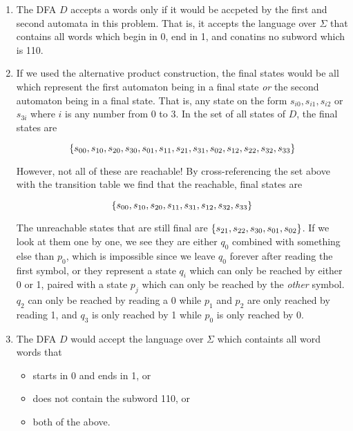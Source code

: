 \documentclass{article}
\begin{document}
\begin{enumerate}
    \item
        The DFA $D$ accepts a words only if it would be accpeted by the first and second automata in this problem. That is, it accepts the language over $\Sigma$ that contains all words which begin in 0, end in 1, and conatins no subword which is 110.
    \item
        If we used the alternative product construction, the final states would be all which represent the first automaton being in a final state \textit{or} the second automaton being in a final state. That is, any state on the form $s_{i0}, s_{i1}, s_{i2}$ or $s_{3i}$ where $i$ is any number from 0 to 3. In the set of all states of $D$, the final states are

        $$\set{s_{00},s_{10},s_{20}, s_{30}, s_{01},s_{11},s_{21},s_{31}, s_{02},s_{12},s_{22},s_{32},s_{33}}$$
 
        However, not all of these are reachable! By cross-referencing the set above with the transition table we find that the reachable, final states are

        $$\set{s_{00},s_{10},s_{20}, s_{11}, s_{31}, s_{12},s_{32},s_{33}}$$

        The unreachable states that are still final are $\set{s_{21},s_{22}, s_{30}, s_{01}, s_{02}}$. If we look at them one by one, we see they are either $q_0$ combined with something else than $p_0$, which is impossible since we leave $q_0$ forever after reading the first symbol, or they represent a state $q_i$ which can only be reached by either 0 or 1, paired with a state $p_j$ which can only be reached by the \textit{other} symbol. $q_2$ can only be reached by reading a 0 while $p_1$ and $p_2$ are only reached by reading 1, and $q_3$ is only reached by 1 while $p_0$ is only reached by 0.

    \item
        The DFA $D$ would accept the language over $\Sigma$ which containts all word words that

        \begin{itemize}
            \item starts in 0 and ends in 1, or
            \item does not contain the subword 110, or
            \item both of the above.
        \end{itemize}

\end{enumerate}
\end{document}
